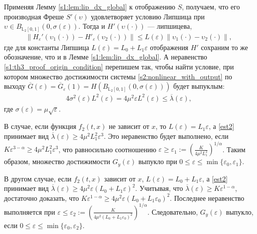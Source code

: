 \documentclass[../main.tex]{subfiles}
\begin{document}
    \doc
    Применяя Лемму \ref{s1:lem:lip_dx_global} к отображению $S$, получаем, что его производная Фреше $S'(\upsilon)$ удовлетворяет условию Липшица
    при $ \upsilon \in B_{\mathbb{L}_2[0,1]}(0,\sigma(\varepsilon))  $.
    Тогда и $ H'(\upsilon(\cdot)) $ --- липшицева, 
    \begin{gather*}
        \left\| H_{\varepsilon}'(\upsilon_1(\cdot)) - H'_{\varepsilon}(\upsilon_2(\cdot)) \right\| \leqslant L(\varepsilon) \left\| \upsilon_1(\cdot) - \upsilon_2(\cdot)\right\|,
    \end{gather*}
    где для константы Липшица $ L(\varepsilon) = L_0 + L_1 \varepsilon$ отображения $ H' $ сохраним то же обозначение, что и в Лемме \ref{s1:lem:lip_dx_global}.
    А неравенство \eqref{s1:th3_proof_origin_condition} перепишем так, чтобы найти условие, при котором множество достижимости системы \eqref{s2:nonlinear_with_output} по выходу $ \overline{G}(\varepsilon) = \overline{G}_{\varepsilon}(1) = H (B_{\mathbb{L}_2[0,1]}(0,\sigma(\varepsilon)))$ будет выпуклым:
    \begin{gather}\label{est2}
        4\sigma^2(\varepsilon)L^2(\varepsilon) = 4\mu^2\varepsilon L^2(\varepsilon) \leqslant \overline{\lambda}(\varepsilon),
    \end{gather}
    где $ \sigma(\varepsilon)  = \mu\sqrt{\varepsilon} $.
    
    В случае, если функция $ f_2(t,x) $ не зависит от $ x $, то $ L(\varepsilon) = L_1 \varepsilon  $, а \eqref{est2} принимает вид $ \overline{\lambda}(\varepsilon) \geqslant 4\mu^2L_1^2 \varepsilon^3 $. 
Это неравенство будет выполнено, если $ K\varepsilon^{3 - \alpha} \geqslant 4\mu^2L_1^2 \varepsilon^3 $, что равносильно соотношению $ \varepsilon \geqslant \varepsilon_1 := \left(\frac{K}{4\mu^2L_1^2}\right)^{1/\alpha} $. 
Таким образом, множество достижимости $ G_y(\varepsilon)$ выпукло при $ 0 \leqslant \varepsilon \leqslant \min\{\varepsilon_0,\varepsilon_1\}  $.  
    
    В другом случае, если $ f_2(t,x) $ зависит от $ x $, $ L(\varepsilon) =L_0+L_1\varepsilon $, а \eqref{est2} принимает вид $ \overline{\lambda}(\varepsilon) \geqslant 4\mu^2 \varepsilon (L_0 + L_1 \varepsilon)^2 $. 
Учитывая, что $ \overline{\lambda}(\varepsilon)  \geqslant K \varepsilon^{1-\alpha} $, достаточно доказать, что $ K \varepsilon^{1-\alpha}  \geqslant 4\mu^2 \varepsilon (L_0 + L_1 \varepsilon_0)^2 $. 
Последнее неравенство выполняется при $ \varepsilon \leqslant \varepsilon_2 := \left(\frac{K}{4\mu^2(L_0 + L_1\varepsilon_0)^2} \right)^{1/\alpha} $. 
Следовательно, $ G_y(\varepsilon) $ выпукло, если $ 0 \leqslant \varepsilon \leqslant \min\{\varepsilon_0, \varepsilon_2\} $.
    
\end{document}
